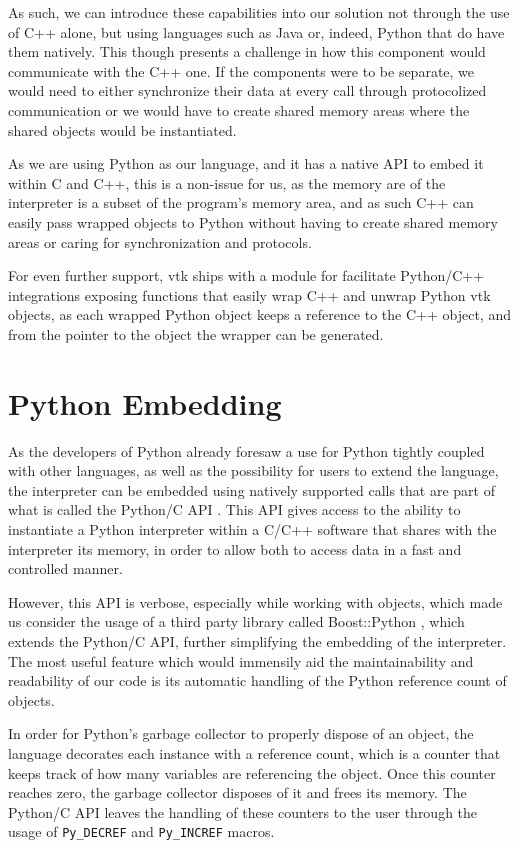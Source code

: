 As such, we can introduce these capabilities into our solution not through the use of C++ alone, but using languages such as Java or, indeed, Python that do have them natively. This though presents a challenge in how this component would communicate with the C++ one. If the components were to be separate, we would need to either synchronize their data at every call through protocolized communication or we would have to create shared memory areas where the shared objects would be instantiated.

As we are using Python as our language, and it has a native API to embed it within C and C++, this is a non-issue for us, as the memory are of the interpreter is a subset of the program's memory area, and as such C++ can easily pass wrapped objects to Python without having to create shared memory areas or caring for synchronization and protocols.

For even further support, \acrshort{vtk} ships with a module for facilitate Python/C++ integrations exposing functions that easily wrap C++ and unwrap Python \acrshort{vtk} objects, as each wrapped Python object keeps a reference to the C++ object, and from the pointer to the object the wrapper can be generated.

\section{Python Embedding}

As the developers of Python already foresaw a use for Python tightly coupled with other languages, as well as the possibility for users to extend the language, the interpreter can be embedded using natively supported calls that are part of what is called the Python/C API \cite{python_c_api}. This API gives access to the ability to instantiate a Python interpreter within a C/C++ software that shares with the interpreter its memory, in order to allow both to access data in a fast and controlled manner.

However, this API is verbose, especially while working with objects, which made us consider the usage of a third party library called Boost::Python
, which extends the Python/C API, further simplifying the embedding of the interpreter. The most useful feature which would immensily aid the maintainability and readability of our code is its automatic handling of the Python reference count of objects.

In order for Python's garbage collector to properly dispose of an object, the language decorates each instance with a reference count, which is a counter that keeps track of how many variables are referencing the object. Once this counter reaches zero, the garbage collector disposes of it and frees its memory. The Python/C API leaves the handling of these counters to the user through the usage of \verb|Py_DECREF| and \verb|Py_INCREF| macros.

